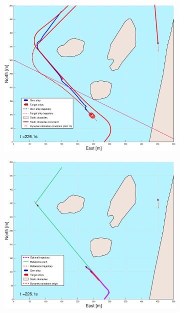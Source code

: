 \begin{figure}[ht]
\begin{subfigure}[b]{0.499\textwidth}
    \end{subfigure}
    \hfill
    \\
    \begin{subfigure}[b]{0.49\textwidth}
        \centering
        \includegraphics[width=\textwidth]{Images/Figures/Helloya_Rev/_Simple_1fig1_time=226}
    \end{subfigure}
    \hfill
    \begin{subfigure}[b]{0.499\textwidth}
        \centering
        \includegraphics[width=\textwidth]{Images/Figures/Helloya_Rev/_Simple_1fig999_time=226}

\end{subfigure}
\end{figure}
